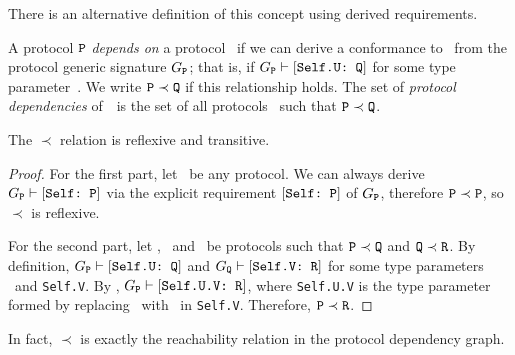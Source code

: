 \documentclass[../generics]{subfiles}
\begin{document}
There is an alternative definition of this concept using derived requirements.
\begin{definition}
A protocol $\texttt{P}$ \emph{depends on} a protocol \tQ\ if we can derive a conformance to \tQ\ from the protocol generic signature $G_{\texttt{P}}$; that is, if $G_{\texttt{P}}\vdash[\texttt{Self.U:~Q}]$ for some type parameter~\SelfU. We write $\texttt{P}\prec\texttt{Q}$ if this relationship holds. The set of \emph{protocol dependencies} of~\tP\ is the set of all protocols \tQ\ such that $\texttt{P}\prec\texttt{Q}$.
\end{definition}

\begin{proposition}
The $\prec$ relation is reflexive and transitive.
\end{proposition}
\begin{proof}
For the first part, let \tP\ be any protocol. We can always derive $G_{\texttt{P}}\vdash[\texttt{Self:~P}]$ via the explicit requirement $[\texttt{Self:~P}]$ of $G_{\texttt{P}}$, therefore $\texttt{P}\prec\texttt{P}$, so $\prec$ is reflexive.

For the second part, let \tP, \tQ\ and \tR\ be protocols such that $\texttt{P}\prec\texttt{Q}$ and $\texttt{Q}\prec\texttt{R}$.  By definition, $G_{\texttt{P}}\vdash[\texttt{Self.U:~Q}]$ and $G_{\texttt{Q}}\vdash[\texttt{Self.V:~R}]$ for some type parameters \SelfU\ and \texttt{Self.V}. By , $G_{\texttt{P}}\vdash[\texttt{Self.U.V:~R}]$, where \texttt{Self.U.V} is the type parameter formed by replacing \tSelf\ with \SelfU\ in \texttt{Self.V}. Therefore, $\texttt{P}\prec\texttt{R}$.
\end{proof}

In fact, $\prec$ is exactly the reachability relation in the protocol dependency graph.
\end{document}
